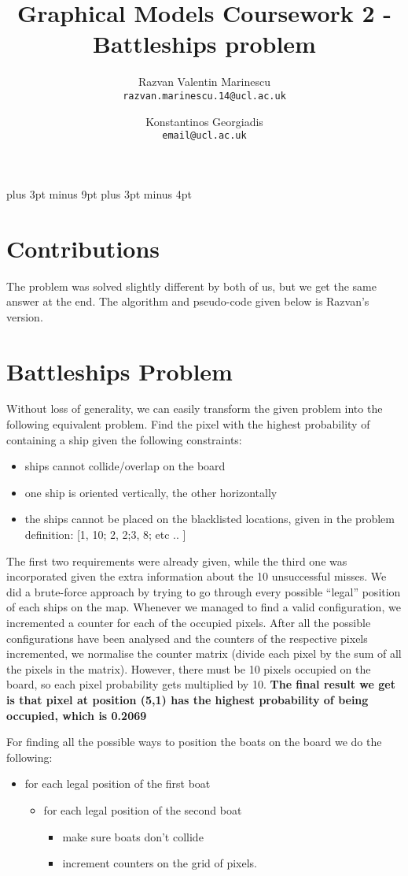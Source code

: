 \documentclass[11pt,a4paper,oneside]{report}
\title{Graphical Models Coursework 2 - Battleships problem}
\author{
    Razvan Valentin Marinescu\\
    \texttt{razvan.marinescu.14@ucl.ac.uk}
    \and
    Konstantinos Georgiadis\\
    \texttt{email@ucl.ac.uk}
}
\begin{document}
\belowdisplayskip=12pt plus 3pt minus 9pt
\belowdisplayshortskip=7pt plus 3pt minus 4pt

\maketitle{}

\section*{Contributions}

The problem was solved slightly different by both of us, but we get the same answer at the end. The algorithm and pseudo-code given below is Razvan's version.

\section*{Battleships Problem}

Without loss of generality, we can easily transform the given problem into the following equivalent problem. Find the pixel with the highest probability of containing a ship given the following constraints: 
\begin{itemize}
 \item ships cannot collide/overlap on the board
 \item one ship is oriented vertically, the other horizontally
 \item the ships cannot be placed on the blacklisted locations, given in the problem definition: [1, 10; 2, 2;3, 8; etc .. ]
\end{itemize}

The first two requirements were already given, while the third one was incorporated given the extra information about the 10 unsuccessful misses. We did a brute-force approach by trying to go through every possible “legal” position of each ships on the map. Whenever we managed to find a valid configuration, we incremented a counter for each of the occupied pixels. After all the possible configurations have been analysed and the counters of the respective pixels incremented, we normalise the counter matrix (divide each pixel by the sum of all the pixels in the matrix). However, there must be 10 pixels occupied on the board, so each pixel probability gets multiplied by 10. \textbf{The final result we get is that pixel at position (5,1) has the highest probability of being occupied, which is 0.2069}

For finding all the possible ways to position the boats on the board we do the following:
\begin{itemize}
 \item for each legal position of the first boat
  \begin{itemize}
  \item for each legal position of the second boat
      \begin{itemize}
      \item make sure boats don't collide
      \item increment counters on the grid of pixels.
      \end{itemize}
  \end{itemize}
\end{itemize}
\end{document}
